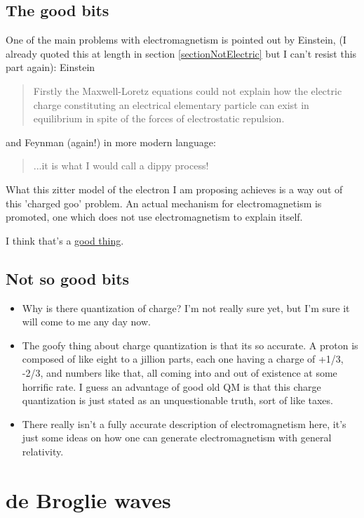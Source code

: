 \documentclass[../rzero]{subfiles}
\begin{document}
\subsection{The good bits}
One of the main problems with electromagnetism is pointed out by Einstein, (I already quoted this at length in section \ref{sectionNotElectric} but I can't resist this part again): Einstein\cite{Einstein1920}
\begin{quotation}
	Firstly the Maxwell-Loretz equations could not explain how the electric charge constituting an electrical elementary particle can exist in equilibrium in spite of the forces of electrostatic repulsion.  
\end{quotation}

and Feynman\cite{Feynman1985} (again!) in more modern language: 
\begin{quotation}
...it is what I would call a dippy process! 
\end{quotation}

What this zitter model of the electron I am proposing achieves is a way out of this 'charged goo' problem. An actual mechanism for electromagnetism is promoted, one which does not use electromagnetism to explain itself. 

I think that's a \href{https://tenor.com/view/martha-stewart-toast-good-thing-gif-4272733}{good thing}. 

\subsection{Not so good bits}
\begin{itemize}
	\item{Why is there quantization of charge? I'm not really sure yet, but I'm sure it will come to me any day now.} 
	\item{The goofy thing about charge quantization is that its so accurate. A proton is composed of like eight to a jillion parts, each one having a charge of +1/3, -2/3, and numbers like that, all coming into and out of existence at some horrific rate. I guess an advantage of good old QM is that this charge quantization is just stated as an unquestionable truth, sort of like taxes.}
	\item{There really isn't a fully accurate description of electromagnetism here, it's just some ideas on how one can generate electromagnetism with general relativity.}
\end{itemize}


\section{de Broglie waves}
\end{document}
